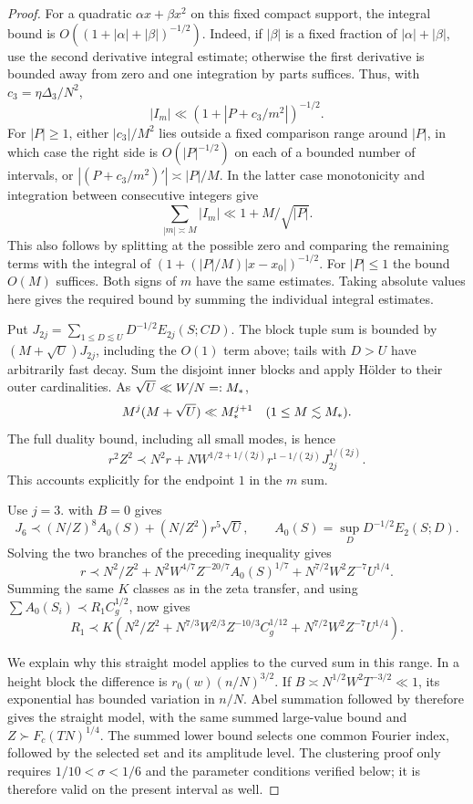 \begin{proof}
For a quadratic $\alpha x+\beta x^2$ on this fixed compact support,
the integral bound is $O((1+|\alpha|+|\beta|)^{-1/2})$.
Indeed, if $|\beta|$ is a fixed fraction of $|\alpha|+|\beta|$,
use the second derivative integral estimate; otherwise the first
derivative is bounded away from zero and one integration by parts
suffices. Thus, with $c_3=\eta\Delta_3/N^2$,
\[
 |I_m|\ll (1+|P+c_3/m^2|)^{-1/2}.
\]
For $|P|\ge1$, either $|c_3|/M^2$ lies outside a fixed comparison range around $|P|$, in
which case the right side is $O(|P|^{-1/2})$ on each of a bounded
number of intervals, or
$|(P+c_3/m^2)'|\asymp|P|/M$.
In the latter case monotonicity and integration between consecutive
integers give
\[
 \sum_{|m|\asymp M}|I_m|\ll 1+M/\sqrt{|P|}.
\]
This also follows by splitting at the possible zero and comparing the
remaining terms with the integral of
$(1+(|P|/M)|x-x_0|)^{-1/2}$.
For $|P|\le1$ the bound $O(M)$ suffices.
Both signs of $m$ have the same estimates. Taking absolute values
here gives the required bound by summing the individual integral estimates.

Put
$J_{2j}=\sum_{1\le D\lesssim U}D^{-1/2}E_{2j}(S;CD)$.
The block tuple sum is bounded by
$(M+\sqrt U)J_{2j}$, including the $O(1)$ term above; tails with
$D>U$ have arbitrarily fast decay. Sum the disjoint inner blocks
and apply H\"older to their outer cardinalities.
As $\sqrt U\ll W/N=:M_{*}$,
\[
 M^{j}(M+\sqrt U)\ll M_{*}^{j+1}\quad(1\le M\lesssim M_{*}).
\]
The full duality bound, including all small modes, is hence
\[
 r^2Z^2\prec N^2r+
 NW^{1/2+1/(2j)}r^{1-1/(2j)}J_{2j}^{1/(2j)}.
\]
This accounts explicitly for the endpoint $1$ in the $m$ sum.

Use $j=3$. \cite[Proposition~\ref*{six-prop:allenergy}]{Weighted} with $B=0$ gives
\[
 J_6\prec (N/Z)^8 A_0(S)+(N/Z^2)r^5\sqrt U,
 \qquad A_0(S)=\sup_D D^{-1/2}E_2(S;D).
\]
Solving the two branches of the preceding inequality gives
\[
 r\prec N^2/Z^2+N^2W^{4/7}Z^{-20/7}A_0(S)^{1/7}
                  +N^{7/2}W^2Z^{-7}U^{1/4}.
\]
Summing the same $K$ classes as in the zeta transfer, and using
$\sum A_0(S_i)\prec R_1C_g^{1/2}$, now gives
\[
 R_1\prec K\left(N^2/Z^2+
 N^{7/3}W^{2/3}Z^{-10/3}C_g^{1/12}
 +N^{7/2}W^2Z^{-7}U^{1/4}\right).
\]

We explain why this straight model applies to the curved sum
in this range. In a height block the difference is
$r_0(w)(n/N)^{3/2}$. If
$B\asymp N^{1/2}W^2T^{-3/2}\ll1$, its exponential has bounded
variation in $n/N$. Abel summation followed by
\cite[Lemma~\ref*{six-lem:completionproof}]{Weighted} therefore gives the straight model,
with the same summed large-value bound and $Z\succ F_c(TN)^{1/4}$.
The summed lower bound selects one common Fourier index, followed
by the selected set and its amplitude level. The clustering proof only requires
$1/10<\sigma<1/6$ and the parameter conditions verified below;
it is therefore valid on the present interval as well.


\end{proof}
